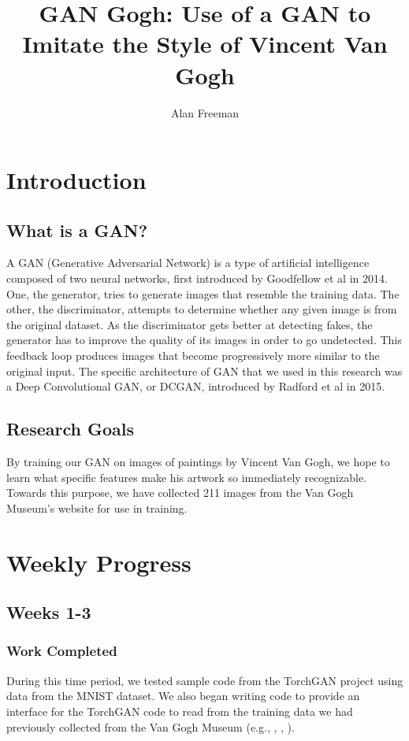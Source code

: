\documentclass[12pt,letterpaper]{article}
\author{Alan Freeman}
\title{GAN Gogh: Use of a GAN to Imitate the Style of Vincent Van Gogh}
\begin{document}
	\maketitle
	\section{Introduction}
	\subsection{What is a GAN?}
	A GAN (Generative Adversarial Network) is a type of artificial intelligence composed of two neural networks, first introduced by Goodfellow et al in 2014.\cite{NIPS2014_5ca3e9b1}
	One, the generator, tries to generate images that resemble the training data.
	The other, the discriminator, attempts to determine whether any given image is from the original dataset.
	As the discriminator gets better at detecting fakes, the generator has to improve the quality of its images in order to go undetected.
	This feedback loop produces images that become progressively more similar to the original input.
	The specific architecture of GAN that we used in this research was a Deep Convolutional GAN, or DCGAN, introduced by Radford et al in 2015.\cite{radford2015unsupervised}
	\subsection{Research Goals}
	By training our GAN on images of paintings by Vincent Van Gogh, we hope to learn what specific features make his artwork so immediately recognizable.
	Towards this purpose, we have collected 211 images from the Van Gogh Museum's website for use in training.
	\section{Weekly Progress}
	\subsection{Weeks 1-3}
	\subsubsection{Work Completed}
	During this time period, we tested sample code from the TorchGAN\cite{pal2019torchgan} project using data from the MNIST\cite{lecun2010mnist} dataset.
	We also began writing code to provide an interface for the TorchGAN code to read from the training data we had previously collected from the Van Gogh Museum (e.g., \cite{001}, \cite{002}, \cite{003}).
\end{document}
